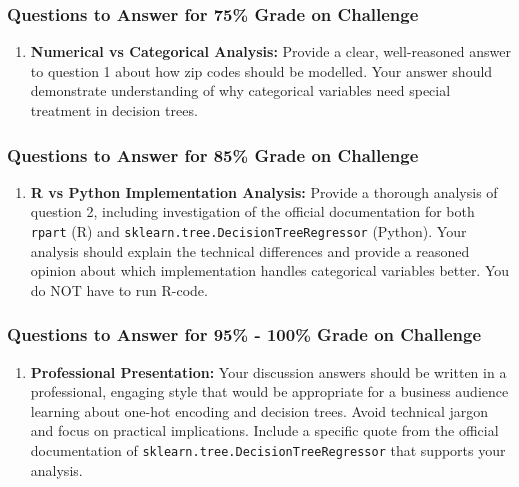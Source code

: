 \documentclass[
  letterpaper,
  DIV=11,
  numbers=noendperiod]{scrartcl}
\providecommand{\tightlist}{%
  \setlength{\itemsep}{0pt}\setlength{\parskip}{0pt}}
\begin{document}
\subsubsection{Questions to Answer for 75\% Grade on
Challenge}\label{questions-to-answer-for-75-grade-on-challenge}

\begin{enumerate}
\def\labelenumi{\arabic{enumi}.}
\tightlist
\item
  \textbf{Numerical vs Categorical Analysis:} Provide a clear,
  well-reasoned answer to question 1 about how zip codes should be
  modelled. Your answer should demonstrate understanding of why
  categorical variables need special treatment in decision trees.
\end{enumerate}

\subsubsection{Questions to Answer for 85\% Grade on
Challenge}\label{questions-to-answer-for-85-grade-on-challenge}

\begin{enumerate}
\def\labelenumi{\arabic{enumi}.}
\setcounter{enumi}{1}
\tightlist
\item
  \textbf{R vs Python Implementation Analysis:} Provide a thorough
  analysis of question 2, including investigation of the official
  documentation for both \texttt{rpart} (R) and
  \texttt{sklearn.tree.DecisionTreeRegressor} (Python). Your analysis
  should explain the technical differences and provide a reasoned
  opinion about which implementation handles categorical variables
  better. You do NOT have to run R-code.
\end{enumerate}

\subsubsection{Questions to Answer for 95\% - 100\% Grade on
Challenge}\label{questions-to-answer-for-95---100-grade-on-challenge}

\begin{enumerate}
\def\labelenumi{\arabic{enumi}.}
\setcounter{enumi}{2}
\tightlist
\item
  \textbf{Professional Presentation:} Your discussion answers should be
  written in a professional, engaging style that would be appropriate
  for a business audience learning about one-hot encoding and decision
  trees. Avoid technical jargon and focus on practical implications.
  Include a specific quote from the official documentation of
  \texttt{sklearn.tree.DecisionTreeRegressor} that supports your
  analysis.
\end{enumerate}
\end{document}
